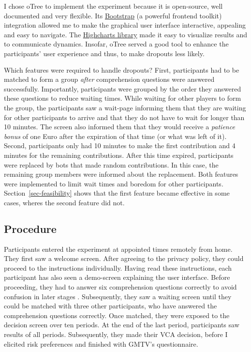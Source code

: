 \documentclass[
  authoryear,
  preprint,
  3p]{elsarticle}
\begin{document}
I chose oTree \citep{oTree} to implement the experiment because it is
open-source, well documented and very flexible. Its
\href{https://getbootstrap.com/}{Bootstrap} (a powerful frontend
toolkit) integration allowed me to make the graphical user interface
interactive, appealing and easy to navigate. The
\href{https://www.highcharts.com/}{Highcharts library} made it easy to
visualize results and to communicate dynamics. Insofar, oTree served a
good tool to enhance the participants' user experience and thus, to make
dropouts less likely.

Which features were required to handle dropouts? First, participants had
to be matched to form a group \emph{after} comprehension questions were
answered successfully. Importantly, participants were grouped by the
order they answered these questions to reduce waiting times. While
waiting for other players to form the group, the participants saw a
wait-page informing them that they are waiting for other participants to
arrive and that they do not have to wait for longer than 10 minutes. The
screen also informed them that they would receive a \emph{patience
bonus} of one Euro after the expiration of that time (or what was left
of it). Second, participants only had 10 minutes to make the first
contribution and 4 minutes for the remaining contributions. After this
time expired, participants were replaced by bots that made random
contributions. In this case, the remaining group members were informed
about the replacement. Both features were implemented to limit wait
times and boredom for other participants. Section~\ref{sec-feasibility}
shows that the first feature became effective in some cases, wheres the
second feature did not.

\hypertarget{sec-procedure}{%
\subsection{Procedure}\label{sec-procedure}}

Participants entered the experiment at appointed times remotely from
home. They first saw a welcome screen. After agreeing to the privacy
policy, they could proceed to the instructions individually. Having read
these instructions, each participant has also seen a demo-screen
explaining the user interface. Before proceeding, they had to answer six
comprehension questions correctly to avoid confusion in later stages
\citep{FerraroVossler2010}. Subsequently, they saw a waiting screen
until they could be matched with three other participants, who have
answered the comprehension questions correctly. Once matched, they were
exposed to the decision screen over ten periods. At the end of the last
period, participants saw results of all periods. Subsequently, they made
their VCA decision, before I elicited risk preferences
\citep{HoltLaury2002} and finished with GMTV's questionnaire.
\end{document}
